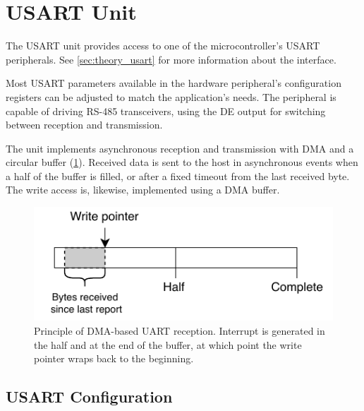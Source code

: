 \section{USART Unit}

The \gls{USART} unit provides access to one of the microcontroller's \gls{USART} peripherals. See \cref{sec:theory_usart} for more information about the interface.

Most \gls{USART} parameters available in the hardware peripheral's configuration registers can be adjusted to match the application's needs. The peripheral is capable of driving RS-485 transceivers, using the \gls{DE} output for switching between reception and transmission.

The unit implements asynchronous reception and transmission with \gls{DMA} and a circular buffer (\cref{fig:uart_rx_dma}). Received data is sent to the host in asynchronous events when a half of the buffer is filled, or after a fixed timeout from the last received byte. The write access is, likewise, implemented using a \gls{DMA} buffer.

\begin{figure}[h]
	\centering
	\includegraphics[scale=1]{img/uart-dma.pdf}
	\caption{\label{fig:uart_rx_dma}Principle of DMA-based UART reception. Interrupt is generated in the half and at the end of the buffer, at which point the write pointer wraps back to the beginning.}
\end{figure}

\subsection{USART Configuration}

